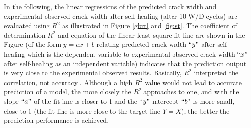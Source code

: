 \documentclass[11pt]{article}
\begin{document}
	In the following, the linear regressions of the predicted crack width and experimental observed crack width after self-healing (after 10 W/D cycles) are evaluated using $R^2$ as illustrated in Figure \ref{gbrt} and \ref{fig:st}. The coefficient of determination $R^2$ and equation of the linear least square fit line are shown in the Figure (of the form $y = ax +b$ relating predicted crack width $``y"$ after self-healing which is the dependent variable to experimental observed crack width $``x"$ after self-healing as an independent variable) indicates that the prediction output is very close to the experimental observed results. Basically, $R^2$ interpreted the correlation, not accuracy \cite{khanal2018integration}. Although a high $R^2$ value would not lead to accurate prediction of a model, the more closely the $R^2$ approaches to one, and with the slope $``a"$ of the fit line is closer to 1 and the $``y"$ intercept $``b"$ is more small, close to 0 (the fit line is more close to the target line $Y = X$), the better the prediction performance is achieved. 
	
\end{document}
